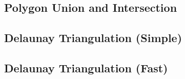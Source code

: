 \subsection{Polygon Union and Intersection}

\subsection{Delaunay Triangulation (Simple)}

\subsection{Delaunay Triangulation (Fast)}

